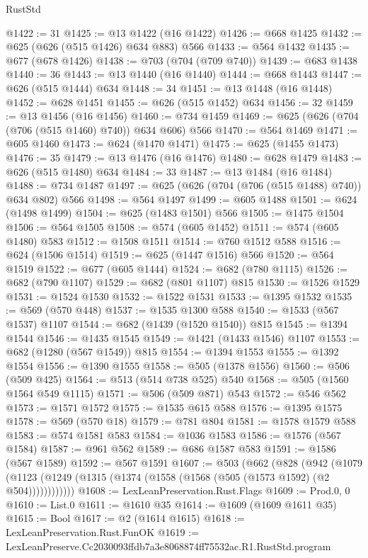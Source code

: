 \begin{lexlean}{RustStd}
\begin{coremodule}
@1422 := 31
@1425 := @13 @1422 (@16 @1422)
@1426 := @668 @1425
@1432 := @625 (@626 (@515 @1426) @634 @883) @566
@1433 := @564 @1432
@1435 := @677 (@678 @1426)
@1438 := @703 (@704 (@709 @740))
@1439 := @683 @1438
@1440 := 36
@1443 := @13 @1440 (@16 @1440)
@1444 := @668 @1443
@1447 := @626 (@515 @1444) @634
@1448 := 34
@1451 := @13 @1448 (@16 @1448)
@1452 := @628 @1451
@1455 := @626 (@515 @1452) @634
@1456 := 32
@1459 := @13 @1456 (@16 @1456)
@1460 := @734 @1459
@1469 := @625 (@626 (@704 (@706 (@515 @1460) @740)) @634 @606) @566
@1470 := @564 @1469
@1471 := @605 @1460
@1473 := @624 (@1470 @1471)
@1475 := @625 (@1455 @1473)
@1476 := 35
@1479 := @13 @1476 (@16 @1476)
@1480 := @628 @1479
@1483 := @626 (@515 @1480) @634
@1484 := 33
@1487 := @13 @1484 (@16 @1484)
@1488 := @734 @1487
@1497 := @625 (@626 (@704 (@706 (@515 @1488) @740)) @634 @802) @566
@1498 := @564 @1497
@1499 := @605 @1488
@1501 := @624 (@1498 @1499)
@1504 := @625 (@1483 @1501) @566
@1505 := @1475 @1504
@1506 := @564 @1505
@1508 := @574 (@605 @1452)
@1511 := @574 (@605 @1480) @583
@1512 := @1508 @1511
@1514 := @760 @1512 @588
@1516 := @624 (@1506 @1514)
@1519 := @625 (@1447 @1516) @566
@1520 := @564 @1519
@1522 := @677 (@605 @1444)
@1524 := @682 (@780 @1115)
@1526 := @682 (@790 @1107)
@1529 := @682 (@801 @1107) @815
@1530 := @1526 @1529
@1531 := @1524 @1530
@1532 := @1522 @1531
@1533 := @1395 @1532
@1535 := @569 (@570 @448)
@1537 := @1535 @1300 @588
@1540 := @1533 (@567 @1537) @1107
@1544 := @682 (@1439 (@1520 @1540)) @815
@1545 := @1394 @1544
@1546 := @1435 @1545
@1549 := @1421 (@1433 @1546) @1107
@1553 := @682 (@1280 (@567 @1549)) @815
@1554 := @1394 @1553
@1555 := @1392 @1554
@1556 := @1390 @1555
@1558 := @505 (@1378 @1556)
@1560 := @506 (@509 @425)
@1564 := @513 (@514 @738 @525) @540
@1568 := @505 (@1560 @1564 @549 @1115)
@1571 := @506 (@509 @871) @543
@1572 := @546 @562
@1573 := @1571 @1572
@1575 := @1535 @615 @588
@1576 := @1395 @1575
@1578 := @569 (@570 @18)
@1579 := @781 @804
@1581 := @1578 @1579 @588
@1583 := @574 @1581 @583
@1584 := @1036 @1583
@1586 := @1576 (@567 @1584)
@1587 := @961 @562
@1589 := @686 @1587 @583
@1591 := @1586 (@567 @1589)
@1592 := @567 @1591
@1607 := @503
    (@662
      (@828
        (@942
          (@1079 (@1123 (@1249 (@1315 (@1374 (@1558 (@1568 (@505 (@1573 @1592) (@2 @504))))))))))))
@1608 := LexLeanPreservation.Rust.Flags
@1609 := Prod.{0, 0}
@1610 := List.{0}
@1611 := @1610 @35
@1614 := @1609 (@1609 @1611 @35)
@1615 := Bool
@1617 := @2 (@1614 @1615)
@1618 := LexLeanPreservation.Rust.FunOK
@1619 := LexLeanPreserve.Cc2030093ffdb7a3e8068874ff75532ac.R1.RustStd.program

\end{coremodule}
\end{lexlean}

